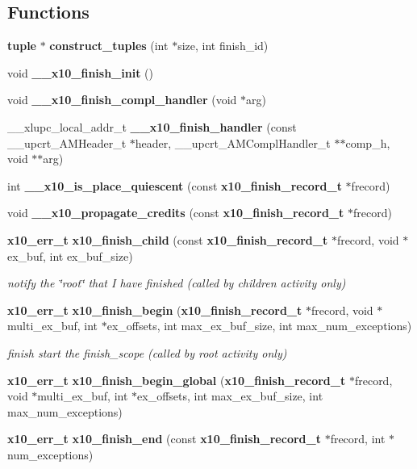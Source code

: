 \subsection*{Functions}
\begin{CompactItemize}
\item 
{\bf tuple} $\ast$ {\bf construct\_\-tuples} (int $\ast$size, int finish\_\-id)
\item 
void {\bf \_\-\_\-x10\_\-finish\_\-init} ()
\item 
void {\bf \_\-\_\-x10\_\-finish\_\-compl\_\-handler} (void $\ast$arg)
\item 
\_\-\_\-xlupc\_\-local\_\-addr\_\-t {\bf \_\-\_\-x10\_\-finish\_\-handler} (const \_\-\_\-upcrt\_\-AMHeader\_\-t $\ast$header, \_\-\_\-upcrt\_\-AMCompl\-Handler\_\-t $\ast$$\ast$comp\_\-h, void $\ast$$\ast$arg)
\item 
int {\bf \_\-\_\-x10\_\-is\_\-place\_\-quiescent} (const {\bf x10\_\-finish\_\-record\_\-t} $\ast$frecord)
\item 
void {\bf \_\-\_\-x10\_\-propagate\_\-credits} (const {\bf x10\_\-finish\_\-record\_\-t} $\ast$frecord)
\item 
{\bf x10\_\-err\_\-t} {\bf x10\_\-finish\_\-child} (const {\bf x10\_\-finish\_\-record\_\-t} $\ast$frecord, void $\ast$ex\_\-buf, int ex\_\-buf\_\-size)
\begin{CompactList}\small\item\em notify the \char`\"{}root\char`\"{} that I have finished (called by children activity only) \item\end{CompactList}\item 
{\bf x10\_\-err\_\-t} {\bf x10\_\-finish\_\-begin} ({\bf x10\_\-finish\_\-record\_\-t} $\ast$frecord, void $\ast$multi\_\-ex\_\-buf, int $\ast$ex\_\-offsets, int max\_\-ex\_\-buf\_\-size, int max\_\-num\_\-exceptions)
\begin{CompactList}\small\item\em finish start the finish\_\-scope (called by root activity only) \item\end{CompactList}\item 
{\bf x10\_\-err\_\-t} {\bf x10\_\-finish\_\-begin\_\-global} ({\bf x10\_\-finish\_\-record\_\-t} $\ast$frecord, void $\ast$multi\_\-ex\_\-buf, int $\ast$ex\_\-offsets, int max\_\-ex\_\-buf\_\-size, int max\_\-num\_\-exceptions)
\item 
{\bf x10\_\-err\_\-t} {\bf x10\_\-finish\_\-end} (const {\bf x10\_\-finish\_\-record\_\-t} $\ast$frecord, int $\ast$num\_\-exceptions)

\end{CompactItemize}
